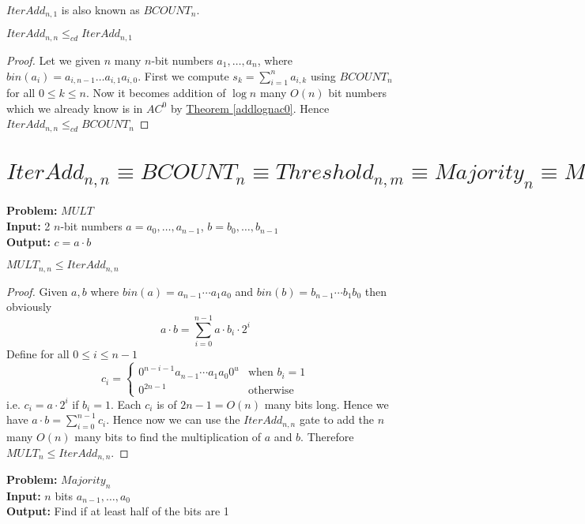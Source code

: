 \begin{remark}
	$IterAdd_{n,1}$ is also known as $BCOUNT_n$.
\end{remark}
\begin{theorem}\label{addnnbcrel}
	$IterAdd_{n,n}\leq_{cd} IterAdd_{n,1}$
\end{theorem}

\begin{proof}
Let we given $n$ many $n$-bit numbers $a_1,\dots,a_n$, where $bin(a_i)=a_{i,n-1}\dots a_{i,1}a_{i,0}$. First we compute $s_{k}=\sum\limits_{i=1}^n a_{i,k}$ using $BCOUNT_n$ for all $0\leq k\leq n$. Now it becomes addition of $\log n$ many $O(n)$ bit numbers which we already know is in $AC^0$ by \hyperref[addlognac0]{Theorem \ref{addlognac0}}. Hence $IterAdd_{n,n}\leq_{cd} BCOUNT_n$
\end{proof}


\section{$IterAdd_{n,n}\equiv BCOUNT_n\equiv Threshold_{n,m} \equiv Majority_n\equiv MULT_{n}\equiv SORT_{n,n}$}
\textbf{Problem:} $MULT$\\
\textbf{Input:} 2 $n$-bit numbers $a=a_0,\dots,a_{n-1}$, $b=b_0,\dots,b_{n-1}$\\
\textbf{Output:} $c=a\cdot b$\\
\begin{theorem}\label{multaddrel}
	$MULT_{n,n}\leq IterAdd_{n,n}$
\end{theorem}
\begin{proof}
	Given $a,b$ where $bin(a)=a_{n-1}\cdots a_1a_0$ and $bin(b)=b_{n-1}\cdots b_1b_0$ then obviously $$a\cdot b=\sum\limits_{i=0}^{n-1}a\cdot b_i\cdot 2^i$$Define for all $0\leq i\leq n-1$ $$c_i=\begin{cases}
		0^{n-i-1}a_{n-1}\cdots a_1a_0 0^u & \text{when $b_i=1$}\\
		0^{2n-1} & \text{otherwise}
	\end{cases}$$i.e. $c_i=a\cdot 2^i$ if $b_i=1$. Each $c_i$ is of $2n-1=O(n) $ many bits long. Hence we have $a\cdot b=\sum\limits_{i=0}^{n-1} c_i$. Hence now we can use the $IterAdd_{n,n}$ gate to add the $n$ many $O(n)$ many bits to find the multiplication of $a$ and $b$. Therefore $MULT_n\leq IterAdd_{n,n}$.
\end{proof}\parinf

\textbf{Problem:} $Majority_n$\\
\textbf{Input:} $n$ bits $a_{n-1},\dots, a_0$\\
\textbf{Output:} Find if at least half of the bits are 1\parinn

